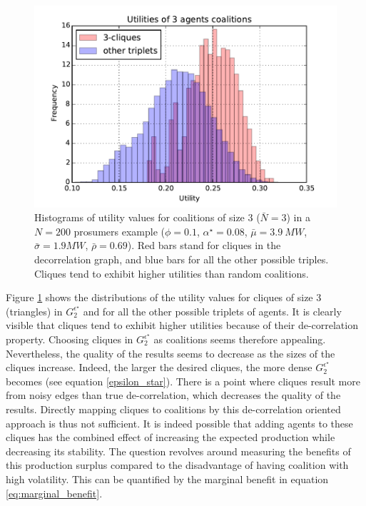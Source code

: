 \documentclass[journal]{IEEEtran}
\begin{document}
\begin{figure}
	\begin{center}
		\includegraphics[scale=.45]{./figs/figure_3}
		\caption{{\footnotesize Histograms of utility values for coalitions of size 3 ($\bar{N}=3$) in a $N=200$ prosumers example ($\phi = 0.1$, $ \alpha^{\star} = 0.08 $, $ \bar{\mu}=3.9\ MW $, $\bar{\sigma} = 1.9 MW $, $ \bar{\rho} = 0.69 $). Red bars stand for cliques in the decorrelation graph, and blue bars for all the other possible triples. Cliques tend to exhibit higher utilities than random coalitions.}}
		\label{fig:histo_cliques}
	\end{center}
\end{figure}

Figure \ref{fig:histo_cliques} shows the distributions of the utility values for cliques of size 3 (triangles) in $ G_{2}^{\epsilon^{\star}} $ and for all the other possible triplets of agents. It is clearly visible that cliques tend to exhibit higher utilities because of their de-correlation property. Choosing cliques in $ G_{2}^{\epsilon^{\star}} $ as coalitions seems therefore appealing. Nevertheless, the quality of the results seems to decrease as the sizes of the cliques increase. Indeed, the larger the desired cliques, the more dense $ G_{2}^{\epsilon^{\star}} $ becomes (see equation \ref{epsilon_star}). There is a point where cliques result more from noisy edges than true de-correlation, which decreases the quality of the results. Directly mapping cliques to coalitions by this de-correlation oriented approach is thus not sufficient. It is indeed possible that adding agents to these cliques has the combined effect of increasing the expected production while decreasing its stability. The question revolves around measuring the benefits of this production surplus compared to the disadvantage of having coalition with high volatility. This can be quantified by the marginal benefit in equation \ref{eq:marginal_benefit}.
\end{document}
